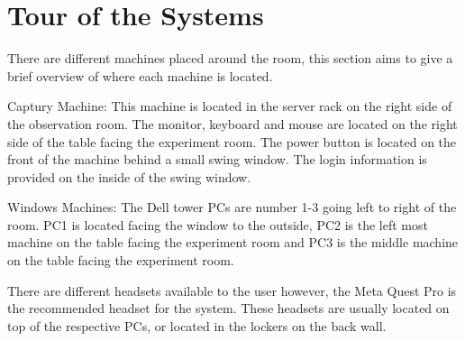 \section{Tour of the Systems}
There are different machines placed around the room, this section aims to give a brief overview of where each machine is located.

Captury Machine: This machine is located in the server rack on the right side of the observation room. The monitor, keyboard and mouse are located on the right side of the table facing the experiment room. The power button is located on the front of the machine behind a small swing window. The login information is provided on the inside of the swing window.

Windows Machines: The Dell tower PCs are number 1-3 going left to right of the room. PC1 is located facing the window to the outside, PC2 is the left most machine on the table facing the experiment room and PC3 is the middle machine on the table facing the experiment room.

There are different headsets available to the user however, the Meta Quest Pro is the recommended headset for the system. These headsets are usually located on top of the respective PCs, or located in the lockers on the back wall.
